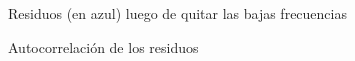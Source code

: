 \documentclass[a4paper]{article}
\begin{document}
\begin{figure}[H]
	\centering
	\caption{Residuos (en azul) luego de quitar las bajas frecuencias} 	
	\label{fig:cpi_cntr_antifft}
\end{figure}

\begin{figure}[H]
	\centering
	\caption{Autocorrelación de los residuos}
	\label{fig:cpi_cntr_acf}
\end{figure}
\end{document}

